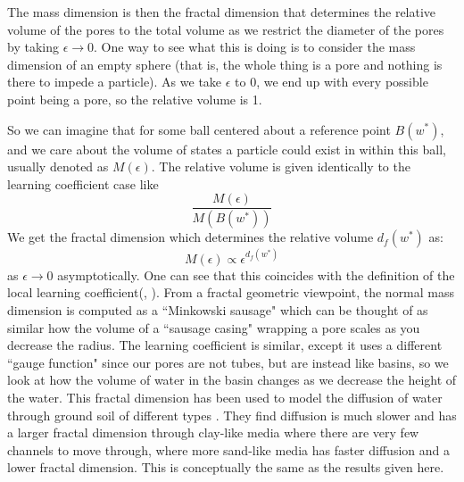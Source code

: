 \documentclass{article} %
\theoremstyle{definition}
\begin{document}
The mass dimension is then the fractal dimension that determines the relative volume of the pores to the total volume as we restrict the diameter of the pores by taking $\epsilon \to 0$. One way to see what this is doing is to consider the mass dimension of an empty sphere (that is, the whole thing is a pore and nothing is there to impede a particle). As we take $\epsilon$ to 0, we end up with every possible point being a pore, so the relative volume is 1.

So we can imagine that for some ball centered about a reference point $B(w^*)$, and we care about the volume of states a particle could exist in within this ball, usually denoted as $M(\epsilon)$. The relative volume is given identically to the learning coefficient case like
\begin{equation}
    \frac{M(\epsilon)}{M(B(w^*))}
\end{equation}
We get the fractal dimension which determines the relative volume $d_f(w^*)$ as:
\label{mass_dim}
\begin{equation}
    M(\epsilon) \propto \epsilon^{d_f(w^*)}
\end{equation}
as $\epsilon \to 0$ asymptotically. One can see that this coincides with the definition of the local learning coefficient(\citep{fractal_unified_approach}, \citep{BOUCHAUD1990127}). From a fractal geometric viewpoint, the normal mass dimension is computed as a ``Minkowski sausage" which can be thought of as similar how the volume of a ``sausage casing" wrapping a pore scales as you decrease the radius. The learning coefficient is similar, except it uses a different ``gauge function" since our pores are not tubes, but are instead like basins, so we look at how the volume of water in the basin changes as we decrease the height of the water. This fractal dimension has been used to model the diffusion of water through ground soil of different types \citep{osti_5454405}. They find diffusion is much slower and has a larger fractal dimension through clay-like media where there are very few channels to move through, where more sand-like media has faster diffusion and a lower fractal dimension. This is conceptually the same as the results given here.
\end{document}

